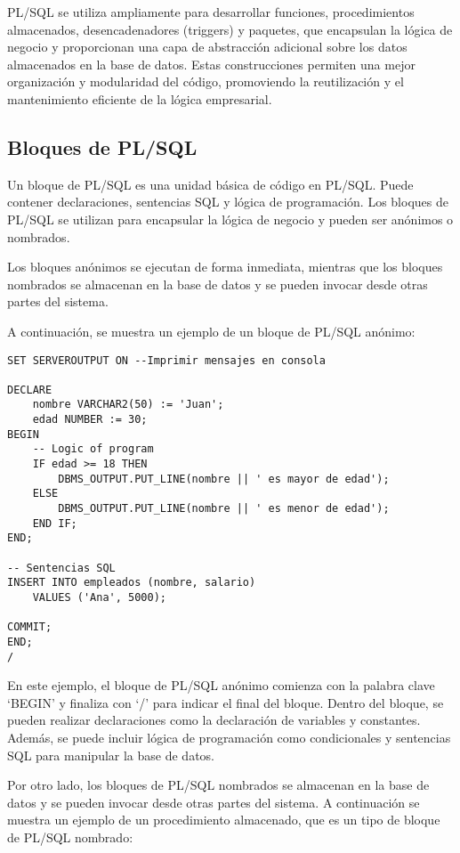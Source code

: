 \documentclass[executivepaper]{article}
\begin{document}
PL/SQL se utiliza ampliamente para desarrollar funciones, procedimientos almacenados, desencadenadores (triggers) y paquetes, que encapsulan la lógica de negocio y proporcionan una capa de abstracción adicional sobre los datos almacenados en la base de datos. Estas construcciones permiten una mejor organización y modularidad del código, promoviendo la reutilización y el mantenimiento eficiente de la lógica empresarial.

\subsection{Bloques de PL/SQL}
Un bloque de PL/SQL es una unidad básica de código en PL/SQL. Puede contener declaraciones, sentencias SQL y lógica de programación. Los bloques de PL/SQL se utilizan para encapsular la lógica de negocio y pueden ser anónimos o nombrados.

Los bloques anónimos se ejecutan de forma inmediata, mientras que los bloques nombrados se almacenan en la base de datos y se pueden invocar desde otras partes del sistema.

A continuación, se muestra un ejemplo de un bloque de PL/SQL anónimo:

\begin{lstlisting}
SET SERVEROUTPUT ON --Imprimir mensajes en consola

DECLARE
    nombre VARCHAR2(50) := 'Juan';
    edad NUMBER := 30;
BEGIN
    -- Logic of program
    IF edad >= 18 THEN
        DBMS_OUTPUT.PUT_LINE(nombre || ' es mayor de edad');
    ELSE
        DBMS_OUTPUT.PUT_LINE(nombre || ' es menor de edad');
    END IF;
END;

-- Sentencias SQL
INSERT INTO empleados (nombre, salario)
    VALUES ('Ana', 5000);

COMMIT;
END;
/
\end{lstlisting}

En este ejemplo, el bloque de PL/SQL anónimo comienza con la palabra clave \enquote*{BEGIN} y finaliza con \enquote*{/} para indicar el final del bloque. Dentro del bloque, se pueden realizar declaraciones como la declaración de variables y constantes. Además, se puede incluir lógica de programación como condicionales y sentencias SQL para manipular la base de datos.

Por otro lado, los bloques de PL/SQL nombrados se almacenan en la base de datos y se pueden invocar desde otras partes del sistema. A continuación se muestra un ejemplo de un procedimiento almacenado, que es un tipo de bloque de PL/SQL nombrado:
\end{document}
